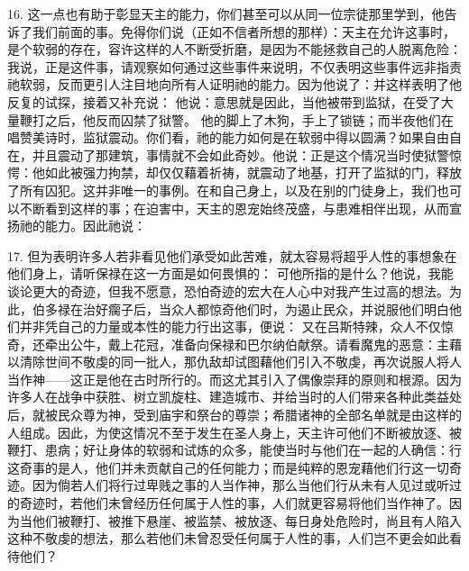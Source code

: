 16. 这一点也有助于彰显天主的能力，你们甚至可以从同一位宗徒那里学到，他告诉了我们前面的事。免得你们说（正如不信者所想的那样）：天主在允许这事时，是个软弱的存在，容许这样的人不断受折磨，是因为不能拯救自己的人脱离危险：我说，正是这件事，请观察如何通过这些事件来说明，不仅表明这些事件远非指责祂软弱，反而更引人注目地向所有人证明祂的能力。因为他说了：并这样表明了他反复的试探，接着又补充说：  他说：意思就是因此，当他被带到监狱，在受了大量鞭打之后，他反而囚禁了狱警。 他的脚上了木狗，手上了锁链；而半夜他们在唱赞美诗时，监狱震动。你们看，祂的能力如何是在软弱中得以圆满？如果自由自在，并且震动了那建筑，事情就不会如此奇妙。他说：正是这个情况当时使狱警惊愕：他如此被强力拘禁，却仅仅藉着祈祷，就震动了地基，打开了监狱的门，释放了所有囚犯。这并非唯一的事例。在和自己身上，以及在别的门徒身上，我们也可以不断看到这样的事；在迫害中，天主的恩宠始终茂盛，与患难相伴出现，从而宣扬祂的能力。因此祂说：\par

17. 但为表明许多人若非看见他们承受如此苦难，就太容易将超乎人性的事想象在他们身上，请听保禄在这一方面是如何畏惧的：  可他所指的是什么？他说，我能谈论更大的奇迹，但我不愿意，恐怕奇迹的宏大在人心中对我产生过高的想法。为此，伯多禄在治好瘸子后，当众人都惊奇他们时，为遏止民众，并说服他们明白他们并非凭自己的力量或本性的能力行出这事，便说：  又在吕斯特辣，众人不仅惊奇，还牵出公牛，戴上花冠，准备向保禄和巴尔纳伯献祭。请看魔鬼的恶意：主藉以清除世间不敬虔的同一批人，那仇敌却试图藉他们引入不敬虔，再次说服人将人当作神——这正是他在古时所行的。而这尤其引入了偶像崇拜的原则和根源。因为许多人在战争中获胜、树立凯旋柱、建造城市、并给当时的人们带来各种此类益处后，就被民众尊为神，受到庙宇和祭台的尊崇；希腊诸神的全部名单就是由这样的人组成。因此，为使这情况不至于发生在圣人身上，天主许可他们不断被放逐、被鞭打、患病；好让身体的软弱和试炼的众多，能使当时与他们在一起的人确信：行这奇事的是人，他们并未贡献自己的任何能力；而是纯粹的恩宠藉他们行这一切奇迹。因为倘若人们将行过卑贱之事的人当作神，那么当他们行从未有人见过或听过的奇迹时，若他们未曾经历任何属于人性的事，人们就更容易将他们当作神了。因为当他们被鞭打、被推下悬崖、被监禁、被放逐、每日身处危险时，尚且有人陷入这种不敬虔的想法，那么若他们未曾忍受任何属于人性的事，人们岂不更会如此看待他们？\par


